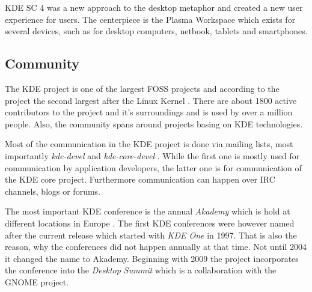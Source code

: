\ac{KDE SC} 4 was a new approach to the desktop metaphor and created a new user
experience for users. The centerpiece is the Plasma Workspace which exists for
several devices, such as for desktop computers, netbook, tablets and
smartphones.


\subsection{Community} %

The KDE project is one of the largest FOSS projects and according to the
project the second largest after the Linux Kernel \cite{KDEPress}. There are
about 1800 active contributors to the project and it's surroundings and is used
by over a million people. Also, the community spans around projects basing on
KDE technologies.

Most of the communication in the KDE project is done via mailing lists, most
importantly \emph{kde-devel} and \emph{kde-core-devel}
\cite{KDEProjectManagement,KDEContribute}. While the first one is mostly used
for communication by application developers, the latter one is for
communication of the KDE core project. Furthermore communication can happen
over \ac{IRC} channels, blogs or forums.

The most important KDE conference is the annual \emph{Akademy} which is hold at
different locations in Europe \cite{KDEHistory}. The first KDE conferences were
however named after the current release which started with \emph{KDE One} in
1997. That is also the reason, why the conferences did not happen annually at
that time. Not until 2004 it changed the name to Akademy. Beginning with 2009
the project incorporates the conference into the \emph{Desktop Summit} which is
a collaboration with the GNOME project.

